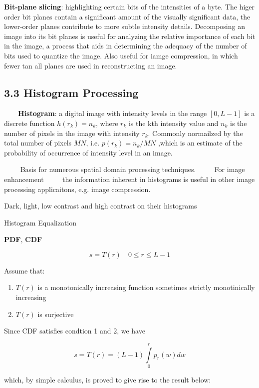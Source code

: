 \documentclass[]{article}
\begin{document}
\textbf{Bit-plane slicing}: highlighting certain bits of the intensities
of a byte. The higer order bit planes contain a significant amount of
the visually significant data, the lower-order planes contribute to more
subtle intensity details. Decomposing an image into its bit planes is
useful for analyzing the relative importance of each bit in the image, a
process that aids in determining the adequacy of the number of bits used
to quantize the image. Also useful for iamge compression, in which fewer
tan all planes are used in reconstructing an image.

\subsection{3.3 Histogram Processing}\label{header-n178}

\(\qquad\)\textbf{Histogram}: a digital image with intensity levels in
the range \([0,L-1]\) is a discrete function \(h(r_k)=n_k\), where
\(r_k\) is the kth intensity value and \(n_k\) is the number of pixels
in the image with intensity \(r_k\). Commonly normailzed by the total
number of pixels \(MN\), i.e. \(p(r_k)=n_k/MN\) ,which is an estimate of
the probability of occurrence of intensity level in an image.

\(\qquad\) Basis for numerous spatial domain processing techniques.
\(\qquad\) For image enhancement \(\qquad\) the information inherent in
histograms is useful in other image processing applicaitons, e.g. image
compression.

Dark, light, low contrast and high contrast on their histograms

Histogram Equalization

\textbf{PDF}, \textbf{CDF}

\[s=T(r)\quad0\leq r\leq L-1\]

Assume that:

\begin{enumerate}
\def\labelenumi{\arabic{enumi}.}
\item
  \(T(r)\) is a monotonically increasing function sometimes strictly
  monotinically increasing 
\item
  \(T(r)\) is surjective
\end{enumerate}

Since CDF satisfies condtion 1 and 2, we have

\[s=T(r)=(L-1)\int\limits^{r}_0 p_r(w)dw\]

which, by simple calculus, is proved to give rise to the result below:
\end{document}
